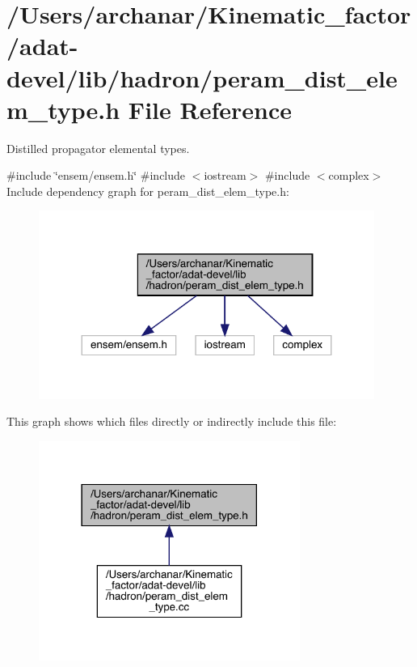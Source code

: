 \hypertarget{adat-devel_2lib_2hadron_2peram__dist__elem__type_8h}{}\section{/\+Users/archanar/\+Kinematic\+\_\+factor/adat-\/devel/lib/hadron/peram\+\_\+dist\+\_\+elem\+\_\+type.h File Reference}
\label{adat-devel_2lib_2hadron_2peram__dist__elem__type_8h}


Distilled propagator elemental types.  


{\ttfamily \#include \char`\"{}ensem/ensem.\+h\char`\"{}}\newline
{\ttfamily \#include $<$iostream$>$}\newline
{\ttfamily \#include $<$complex$>$}\newline
Include dependency graph for peram\+\_\+dist\+\_\+elem\+\_\+type.\+h\+:
\nopagebreak
\begin{figure}[H]
\begin{center}
\leavevmode
\includegraphics[width=311pt]{de/dca/adat-devel_2lib_2hadron_2peram__dist__elem__type_8h__incl}
\end{center}
\end{figure}
This graph shows which files directly or indirectly include this file\+:
\nopagebreak
\begin{figure}[H]
\begin{center}
\leavevmode
\includegraphics[width=242pt]{d7/dec/adat-devel_2lib_2hadron_2peram__dist__elem__type_8h__dep__incl}
\end{center}
\end{figure}
